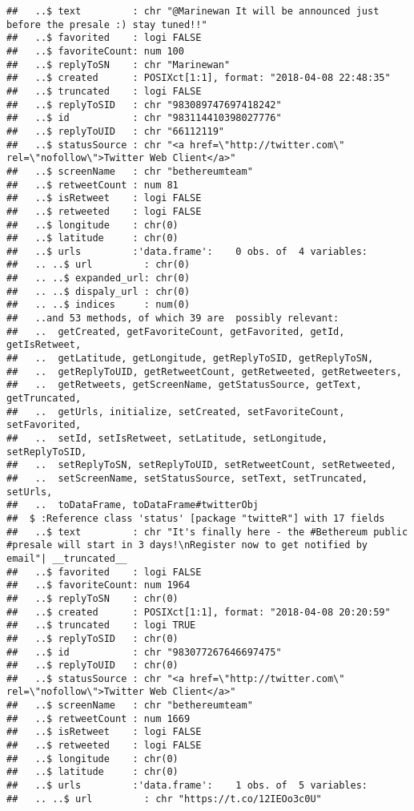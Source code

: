 \documentclass[]{article}
\begin{document}
\begin{verbatim}
##   ..$ text         : chr "@Marinewan It will be announced just before the presale :) stay tuned!!"
##   ..$ favorited    : logi FALSE
##   ..$ favoriteCount: num 100
##   ..$ replyToSN    : chr "Marinewan"
##   ..$ created      : POSIXct[1:1], format: "2018-04-08 22:48:35"
##   ..$ truncated    : logi FALSE
##   ..$ replyToSID   : chr "983089747697418242"
##   ..$ id           : chr "983114410398027776"
##   ..$ replyToUID   : chr "66112119"
##   ..$ statusSource : chr "<a href=\"http://twitter.com\" rel=\"nofollow\">Twitter Web Client</a>"
##   ..$ screenName   : chr "bethereumteam"
##   ..$ retweetCount : num 81
##   ..$ isRetweet    : logi FALSE
##   ..$ retweeted    : logi FALSE
##   ..$ longitude    : chr(0) 
##   ..$ latitude     : chr(0) 
##   ..$ urls         :'data.frame':    0 obs. of  4 variables:
##   .. ..$ url         : chr(0) 
##   .. ..$ expanded_url: chr(0) 
##   .. ..$ dispaly_url : chr(0) 
##   .. ..$ indices     : num(0) 
##   ..and 53 methods, of which 39 are  possibly relevant:
##   ..  getCreated, getFavoriteCount, getFavorited, getId, getIsRetweet,
##   ..  getLatitude, getLongitude, getReplyToSID, getReplyToSN,
##   ..  getReplyToUID, getRetweetCount, getRetweeted, getRetweeters,
##   ..  getRetweets, getScreenName, getStatusSource, getText, getTruncated,
##   ..  getUrls, initialize, setCreated, setFavoriteCount, setFavorited,
##   ..  setId, setIsRetweet, setLatitude, setLongitude, setReplyToSID,
##   ..  setReplyToSN, setReplyToUID, setRetweetCount, setRetweeted,
##   ..  setScreenName, setStatusSource, setText, setTruncated, setUrls,
##   ..  toDataFrame, toDataFrame#twitterObj
##  $ :Reference class 'status' [package "twitteR"] with 17 fields
##   ..$ text         : chr "It's finally here - the #Bethereum public #presale will start in 3 days!\nRegister now to get notified by email"| __truncated__
##   ..$ favorited    : logi FALSE
##   ..$ favoriteCount: num 1964
##   ..$ replyToSN    : chr(0) 
##   ..$ created      : POSIXct[1:1], format: "2018-04-08 20:20:59"
##   ..$ truncated    : logi TRUE
##   ..$ replyToSID   : chr(0) 
##   ..$ id           : chr "983077267646697475"
##   ..$ replyToUID   : chr(0) 
##   ..$ statusSource : chr "<a href=\"http://twitter.com\" rel=\"nofollow\">Twitter Web Client</a>"
##   ..$ screenName   : chr "bethereumteam"
##   ..$ retweetCount : num 1669
##   ..$ isRetweet    : logi FALSE
##   ..$ retweeted    : logi FALSE
##   ..$ longitude    : chr(0) 
##   ..$ latitude     : chr(0) 
##   ..$ urls         :'data.frame':    1 obs. of  5 variables:
##   .. ..$ url         : chr "https://t.co/12IEOo3c0U"

\end{verbatim}
\end{document}
